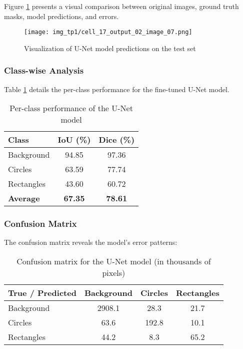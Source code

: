 \documentclass[12pt,a4paper]{article}
\begin{document}
Figure \ref{fig:predictions_visualization} presents a visual comparison between original images, ground truth masks, model predictions, and errors.

\begin{figure}[H]
    \centering
    \texttt{[image: img\_tp1/cell\_17\_output\_02\_image\_07.png]}
    \caption{Visualization of U-Net model predictions on the test set}
    \label{fig:predictions_visualization}
\end{figure}

\subsubsection{Class-wise Analysis}

Table \ref{tab:class_performance} details the per-class performance for the fine-tuned U-Net model.

\begin{table}[H]
\centering
\caption{Per-class performance of the U-Net model}
\label{tab:class_performance}
\begin{tabular}{@{}lcc@{}}
\toprule
\textbf{Class} & \textbf{IoU (\%)} & \textbf{Dice (\%)} \\
\midrule
Background & 94.85 & 97.36 \\
Circles & 63.59 & 77.74 \\
Rectangles & 43.60 & 60.72 \\
\midrule
\textbf{Average} & \textbf{67.35} & \textbf{78.61} \\
\bottomrule
\end{tabular}
\end{table}

\subsubsection{Confusion Matrix}

The confusion matrix reveals the model's error patterns:

\begin{table}[H]
\centering
\caption{Confusion matrix for the U-Net model (in thousands of pixels)}
\label{tab:confusion_matrix}
\begin{tabular}{@{}l|ccc@{}}
\toprule
\textbf{True / Predicted} & \textbf{Background} & \textbf{Circles} & \textbf{Rectangles} \\
\midrule
Background & 2908.1 & 28.3 & 21.7 \\
Circles & 63.6 & 192.8 & 10.1 \\
Rectangles & 44.2 & 8.3 & 65.2 \\
\bottomrule
\end{tabular}
\end{table}
\end{document}
